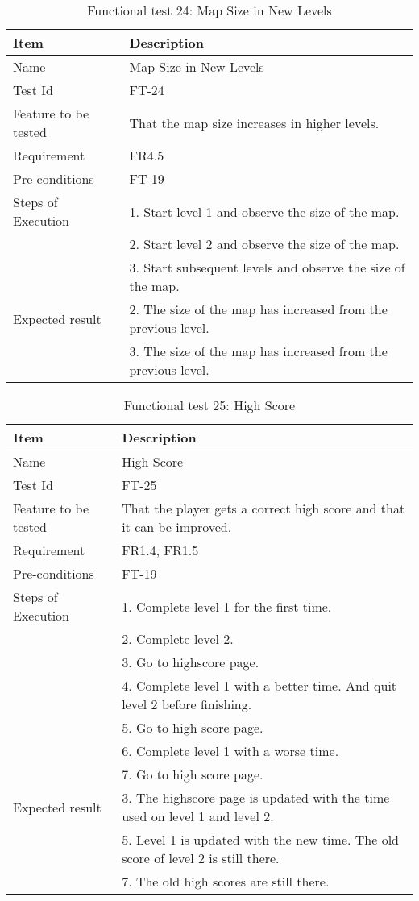 \begin{table}[H]
\centering
	\begin{tabular}{ l | p{8cm} }
		\hline
		\rowcolor{lightgray}
		{\bf Item} & {\bf Description} \\ \hline
		Name & Map Size in New Levels \\ 
		Test Id & FT-24 \\ 
		Feature to be tested & That the map size increases in higher levels. \\ 
		Requirement & FR4.5 \\ 
		Pre-conditions & FT-19 \\ 
		Steps of Execution & 1. Start level 1 and observe the size of the map. \\
		& 2. Start level 2 and observe the size of the map. \\
		& 3. Start subsequent levels and observe the size of the map. \\
		Expected result & 2. The size of the map has increased from the previous level. \\
		& 3. The size of the map has increased from the previous level. \\
		\hline
	\end{tabular}
	\caption{Functional test 24: Map Size in New Levels}
\end{table}

\begin{table}[H]
\centering
	\begin{tabular}{ l | p{8cm} }
		\hline
		\rowcolor{lightgray}
		{\bf Item} & {\bf Description} \\ \hline
		Name & High Score \\ 
		Test Id & FT-25 \\ 
		Feature to be tested & That the player gets a correct high score and that it can be improved. \\ 
		Requirement & FR1.4, FR1.5 \\ 
		Pre-conditions & FT-19 \\ 
		Steps of Execution & 1. Complete level 1 for the first time. \\
		& 2. Complete level 2. \\
		& 3. Go to highscore page. \\
		& 4. Complete level 1 with a better time. And quit level 2 before finishing. \\
		& 5. Go to high score page. \\
		& 6. Complete level 1 with a worse time. \\
		& 7. Go to high score page. \\
		Expected result & 3. The highscore page is updated with the time used on level 1 and level 2. \\
		& 5. Level 1 is updated with the new time. The old score of level 2 is still there. \\
		& 7. The old high scores are still there. \\
		\hline
	\end{tabular}
	\caption{Functional test 25: High Score}
\end{table}

